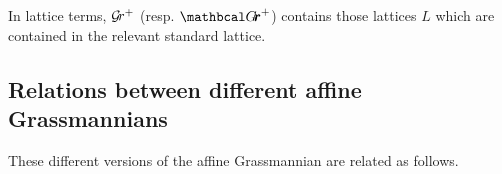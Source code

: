 \documentclass[draft]{article}
\begin{document}
    In lattice terms, $ \mathcal{G}\!r^+$ (resp. ${\Grth}^+$) contains those lattices $L$ which are contained in the relevant standard lattice. 

\subsection{Relations between different affine Grassmannians}
These different versions of the affine Grassmannian are related as follows.  
\end{document}
